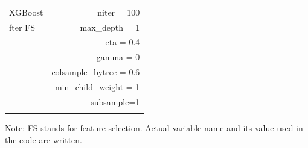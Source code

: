 \documentclass[11pt,a4paper,oneside]{article}
\begin{document}
\begin{table}[t!]
\begin{threeparttable}
\begin{tabular}{*2c}
		\multicolumn{1}{l}{XGBoost} & \multicolumn{1}{r}{niter = 100}\\
		\multicolumn{1}{l}{fter FS} & \multicolumn{1}{r}{max\_depth = 1}\\
		\multicolumn{1}{l}{\multirow{7}{*}{}} & \multicolumn{1}{r}{eta = 0.4}\\
		\multicolumn{1}{l}{\multirow{7}{*}{}} & \multicolumn{1}{r}{gamma = 0}\\
		\multicolumn{1}{l}{\multirow{7}{*}{}} & \multicolumn{1}{r}{colsample\_bytree = 0.6}\\
		\multicolumn{1}{l}{\multirow{7}{*}{}} & \multicolumn{1}{r}{min\_child\_weight = 1}\\
		\multicolumn{1}{l}{\multirow{7}{*}{}} & \multicolumn{1}{r}{subsample=1}\\
		\\\bottomrule
	\end{tabular}
	\begin{tablenotes}
	    \linespread{1}\footnotesize
	    Note: FS stands for feature selection. Actual variable name and its value used in the code are written. 
	\end{tablenotes}
    \end{threeparttable}
	\label{table:3}
\end{table}
\end{document}
